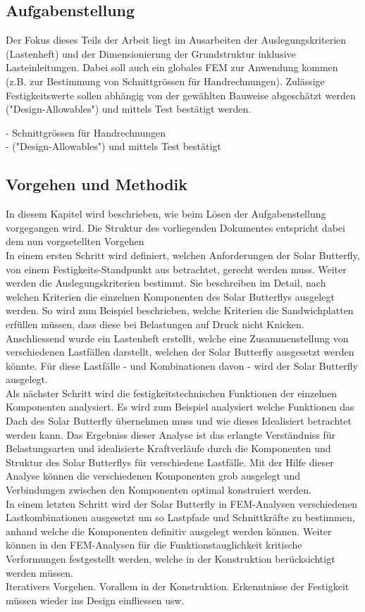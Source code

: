 \subsection{Aufgabenstellung}
Der Fokus dieses Teils der Arbeit liegt im Ausarbeiten der Auslegungskriterien (Lastenheft) und der Dimensionierung der Grundstruktur inklusive Lasteinleitungen.
Dabei soll auch ein globales FEM zur Anwendung kommen (z.B. zur Bestimmung von Schnittgrössen für Handrechnungen).
Zulässige Festigkeitswerte sollen abhängig von der gewählten Bauweise abgeschätzt werden ("Design-Allowables") und mittels Test bestätigt werden.

  - Schnittgrössen für Handrechnungen\\
  - ("Design-Allowables") und mittels Test bestätigt

\subsection{Vorgehen und Methodik}
In diesem Kapitel wird beschrieben, wie beim Lösen der Aufgabenstellung vorgegangen wird. Die Struktur des vorliegenden Dokumentes entspricht dabei dem nun vorgsetellten Vorgehen\\

In einem ersten Schritt wird definiert, welchen Anforderungen der Solar Butterfly, von einem Festigkeits-Standpunkt aus betrachtet, gerecht werden muss. Weiter werden die Auslegungskriterien bestimmt. Sie beschreiben im Detail, nach welchen Kriterien die einzelnen Komponenten des Solar Butterflys ausgelegt werden. So wird zum Beispiel beschrieben, welche Kriterien die Sandwichplatten erfüllen müssen, dass diese bei Belastungen auf Druck nicht Knicken.\\
Anschliessend wurde ein Lastenheft erstellt, welche eine Zusammenstellung von verschiedenen Lastfällen darstellt, welchen der Solar Butterfly ausgesetzt werden könnte. Für diese Lastfälle - und Kombinationen davon - wird der Solar Butterfly ausgelegt.\\
Als nächster Schritt wird die festigkeitstechnischen Funktionen der einzelnen Komponenten analysiert. Es wird zum Beispiel analysiert welche Funktionen das Dach des Solar Butterfly übernehmen muss und wie dieses Idealisiert betrachtet werden kann. Das Ergebniss dieser Analyse ist das erlangte Verständniss für Belastungsarten und idealisierte Kraftverläufe durch die Komponenten und Struktur des Solar Butterflys für verschiedene Lastfälle. Mit der Hilfe dieser Analyse können die verschiedenen Komponenten grob ausgelegt und Verbindungen zwischen den Komponenten optimal konstruiert werden.\\
In einem letzten Schritt wird der Solar Butterfly in FEM-Analysen verschiedenen Lastkombinationen ausgesetzt um so Lastpfade und Schnittkräfte zu bestimmen, anhand welche die Komponenten definitiv ausgelegt werden können. Weiter können in den FEM-Analysen für die Funktionstauglichkeit kritische Verformungen festgestellt werden, welche in der Konstruktion berücksichtigt werden müssen.\\
Iterativers Vorgehen. Vorallem in der Konstruktion. Erkenntnisse der Festigkeit müssen wieder ins Design einfliessen usw.



